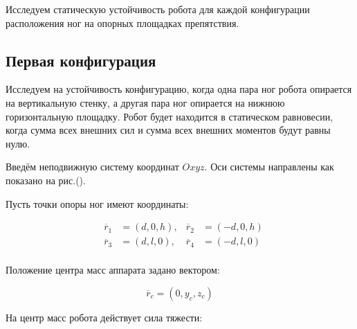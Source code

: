 %

Исследуем статическую устойчивость робота для каждой конфигурации расположения ног на опорных площадках препятствия. 


\subsection{Первая конфигурация}

Исследуем на устойчивость конфигурацию, когда одна пара ног робота опирается на вертикальную стенку, а другая пара ног опирается на нижнюю горизонтальную площадку. Робот будет находится в статическом равновесии, когда сумма всех внешних сил и сумма всех внешних моментов будут равны нулю.

Введём неподвижную систему координат $Oxyz$. Оси системы направлены как показано на рис.().

Пусть точки опоры ног имеют координаты:

\begin{equation}
  \label{eq:step_points}
  \begin{alignedat}{3}
    &\overline{r}_1 &= (d, 0, h) , &\overline{r}_2 &= (-d, 0, h) \\
    &\overline{r}_3 &= (d, l, 0) , &\overline{r}_4 &= (-d, l, 0) \\
  \end{alignedat}
\end{equation}


Положение центра масс аппарата задано вектором:

\[\overline{r}_c = (0, y_c, z_c)\]

На центр масс робота действует сила тяжести:

